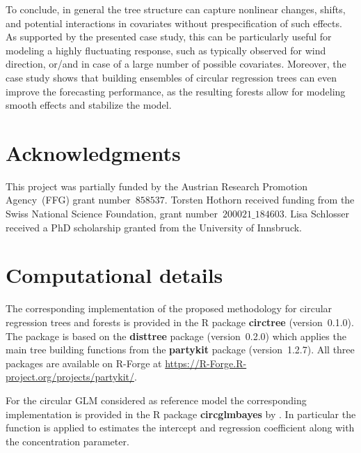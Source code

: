 \documentclass[nojss,shortnames]{jss}
\numberwithin{equation}{section}
\begin{document}
To conclude, in general the tree structure can capture nonlinear changes,
shifts, and potential interactions in covariates without prespecification of
such effects. As supported by the presented case study, this can be
particularly useful for modeling a highly fluctuating response, such as
typically observed for wind direction, or/and in case of a large number of
possible covariates. Moreover, the case study shows that building ensembles of
circular regression trees can even improve the forecasting performance, as the
resulting forests allow for modeling smooth effects and stabilize the model.


\section*{Acknowledgments}
This project was partially funded by the Austrian Research Promotion
Agency~(FFG) grant number~$858537$. Torsten Hothorn received funding from the
Swiss National Science Foundation, grant number~$200021\_184603$. Lisa
Schlosser received a PhD scholarship granted from the University of Innsbruck.

\section*{Computational details}
The corresponding implementation of the proposed methodology for circular
regression trees and forests is provided in the \textsf{R} package
\textbf{circtree} (version~0.1.0). The package is
based on the \textbf{disttree} package
(version~0.2.0) which applies the main tree
building functions from the \textbf{partykit} package
(version~1.2.7). All three packages are available
on \textsf{R}-Forge at {\url{https://R-Forge.R-project.org/projects/partykit/}}.

For the circular GLM considered as reference model the corresponding
implementation is provided in the \textsf{R} package \textbf{circglmbayes} by
\cite{Mulder+Klugkist:2017}. In particular the function  is
applied to estimates the intercept and regression coefficient along with the
concentration parameter.



\end{document}

